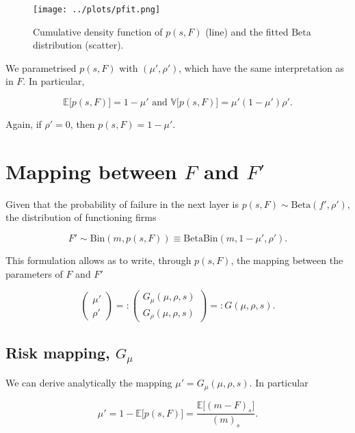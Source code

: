 \documentclass[american, abstract=on]{scrartcl}
\theoremstyle{plain}
\newcommand{\E}{\mathbb{E}}
\newcommand{\V}{\mathbb{V}}
\newcommand{\Beta}{\text{Beta}}
\newcommand{\Bin}{\text{Bin}}
\begin{document}
\begin{figure}[H]
    \centering
    \texttt{[image: ../plots/pfit.png]}
    \caption{Cumulative density function of $p(s, F)$ (line) and the fitted $\Beta$ distribution (scatter).}
    \label{fig:pfit}
\end{figure}

We parametrised $p(s, F)$ with $(\mu', \rho')$, which have the same interpretation as in $F$. In particular,

\begin{equation}
    \E\big[p(s, F)\big] = 1 - \mu' \text{ and } \V\big[p(s, F)\big] = \mu' (1 - \mu')\rho'.
\end{equation}

Again, if $\rho' = 0$, then $p(s, F) = 1 - \mu'$.

\section[Mapping]{Mapping between $F$ and $F'$}

Given that the probability of failure in the next layer is $p(s, F) \sim \Beta(f', \rho')$, the distribution of functioning firms 

\begin{equation}
    F' \sim \Bin(m, p(s, F)) \equiv \Beta\Bin(m, 1 - \mu', \rho').
\end{equation}

This formulation allows as to write, through $p(s, F)$, the mapping between the parameters of $F$ and $F'$

\begin{equation}
    \begin{pmatrix}
        \mu' \\ \rho'
    \end{pmatrix} =: \begin{pmatrix}
        G_\mu(\mu, \rho, s) \\ G_\rho(\mu, \rho, s)
    \end{pmatrix} =: G(\mu, \rho, s).
\end{equation}

\subsection[Mean mapping]{Risk mapping, $G_\mu$}

We can derive analytically the mapping $\mu' = G_\mu(\mu, \rho, s)$. In particular

\begin{equation}
    \mu' = 1 - \E\big[p(s, F)\big] = \frac{\E\big[(m - F)_s\big]}{(m)_s}.
\end{equation}
\end{document}
